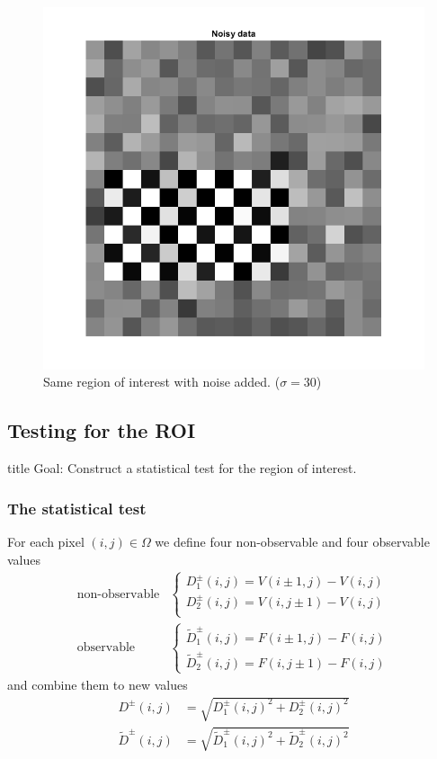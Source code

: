 \documentclass{beamer}
\begin{document}
\begin{frame}
	\begin{figure}
		\includegraphics[width=0.6\linewidth]{Testing/ROI_noisy}
		\caption[Noisy ROI]{Same region of interest with noise added. ($\sigma = 30$)}
		\label{fig:ROI_noisy}
	\end{figure}
\end{frame}

\subsection{Testing for the ROI}

\begin{frame}
	\begin{beamercolorbox}[sep=8pt,center,shadow=true,rounded=true]{title}
		Goal: Construct a statistical test for the region of interest.
	\end{beamercolorbox}
\end{frame}

\subsubsection{The statistical test}

\begin{frame}
	For each pixel $(i, j) \in \Omega$ we define four non-observable and four observable values
	\begin{align*}
		\textrm{non-observable}
		&\begin{cases}
			D_1^\pm(i, j) = V(i \pm 1, j) - V(i, j) \\
			D_2^\pm(i, j) = V(i, j \pm 1) - V(i, j) \\
		\end{cases} \\
		\textrm{observable}
		&\begin{cases}
			\tilde{D}_1^\pm(i, j) = F(i \pm 1, j) - F(i, j) \\
			\tilde{D}_2^\pm(i, j) = F(i, j \pm 1) - F(i, j)
		\end{cases}
	\end{align*}
	and combine them to new values
	\begin{align*}\label{d}
		D^\pm(i, j) &= \sqrt{D_1^\pm(i, j)^2 + D_2^\pm(i, j)^2} \\
		\tilde{D}^\pm(i, j) &= \sqrt{\tilde{D}_1^\pm(i, j)^2 + \tilde{D}_2^\pm(i, j)^2}
	\end{align*}
\end{frame}
\end{document}
